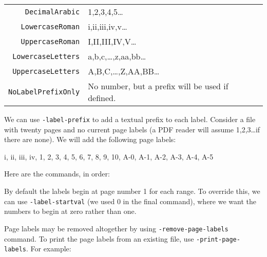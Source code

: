 \documentclass{book}
\begin{document}
\vspace{4mm}
{\small\begin{tabular}{rl}
  \texttt{DecimalArabic} & 1,2,3,4,5\ldots \\
  \texttt{LowercaseRoman} & i,ii,iii,iv,v\ldots \\
  \texttt{UppercaseRoman} & I,II,III,IV,V\ldots \\
  \texttt{LowercaseLetters} & a,b,c,\ldots,z,aa,bb\ldots \\
  \texttt{UppercaseLetters} & A,B,C,\ldots,Z,AA,BB\ldots \\
  \texttt{NoLabelPrefixOnly} & No number, but a prefix will be used if defined.
\end{tabular}}
\vspace{4mm}

\noindent We can use \texttt{-label-prefix} to add a textual prefix to each label. 
Consider a file with twenty pages and no current page labels (a PDF reader will assume 1,2,3\ldots if there are none). We will add the following page labels:

\vspace{4mm}
i, ii, iii, iv, 1, 2, 3, 4, 5, 6, 7, 8, 9, 10, A-0, A-1, A-2, A-3, A-4, A-5
\vspace{4mm}

\noindent Here are the commands, in order:


\noindent{}

\noindent By default the labels begin at page number 1 for each range. To override this, we can use \texttt{-label-startval} (we used $0$ in the final command), where we want the numbers to begin at zero rather than one.



Page labels may be removed altogether by using \texttt{-remove-page-labels} command. To print the page labels from an existing file, use \texttt{-print-page-labels}. For example:
\end{document}
